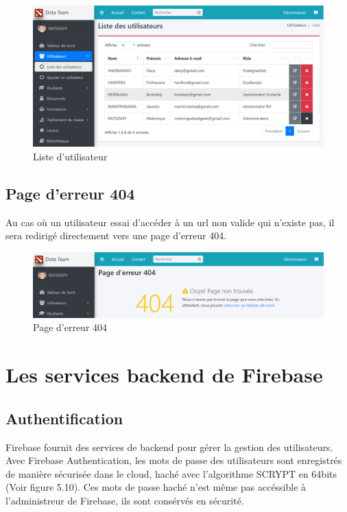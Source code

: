 \begin{figure}[h]
	\centering
	\hspace*{-1.8cm}
	\includegraphics[width=1.2\linewidth]{"Chapitre5/images/listeUtil"}
	\caption{Liste d'utilisateur}
	\label{Liste d'utilisateur}
\end{figure}

\clearpage

\subsection{Page d'erreur 404}
Au cas où un utilisateur essai d'accéder à un url non valide qui n'existe pas, il sera redirigé directement vers une page d'erreur 404.

\begin{figure}[h]
	\centering
	\hspace*{-1.8cm}
	\includegraphics[width=1.2\linewidth]{"Chapitre5/images/error404"}
	\caption{Page d'erreur 404}
	\label{Page d'erreur 404}
\end{figure}

\section{Les services backend de Firebase}
\subsection{Authentification}
Firebase fournit des services de backend pour gérer la gestion des utilisateurs. Avec Firebase Authentication, les mots de passe des utilisateurs sont enregistrés de manière sécurisée dans le cloud, haché avec l'algorithme SCRYPT en 64bits (Voir figure 5.10). Ces mots de passe haché n'est même pas accéssible à l'administreur de Firebase, ils sont consérvés en sécurité.


